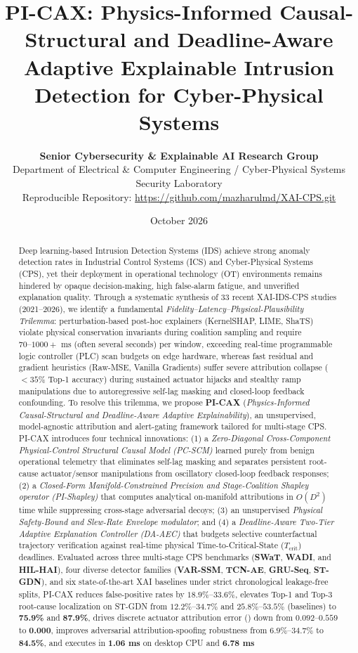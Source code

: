 \documentclass[10pt,a4paper]{article}
\title{\vspace{-12pt}\textbf{\Large\color{primary}PI-CAX: Physics-Informed Causal-Structural and Deadline-Aware Adaptive Explainable Intrusion Detection for Cyber-Physical Systems}}
\author{\textbf{Senior Cybersecurity \& Explainable AI Research Group}\\
\small Department of Electrical \& Computer Engineering / Cyber-Physical Systems Security Laboratory\\
\small Reproducible Repository: \url{https://github.com/mazharulmd/XAI-CPS.git}}
\date{\small October 2026}
\begin{document}
\maketitle
\thispagestyle{fancy}

\begin{abstract}
\noindent Deep learning-based Intrusion Detection Systems (IDS) achieve strong anomaly detection rates in Industrial Control Systems (ICS) and Cyber-Physical Systems (CPS), yet their deployment in operational technology (OT) environments remains hindered by opaque decision-making, high false-alarm fatigue, and unverified explanation quality. Through a systematic synthesis of 33 recent XAI-IDS-CPS studies (2021--2026), we identify a fundamental \emph{Fidelity--Latency--Physical-Plausibility Trilemma}: perturbation-based post-hoc explainers (KernelSHAP, LIME, ShaTS) violate physical conservation invariants during coalition sampling and require $70\text{--}1000+\text{ ms}$ (often several seconds) per window, exceeding real-time programmable logic controller (PLC) scan budgets on edge hardware, whereas fast residual and gradient heuristics (Raw-MSE, Vanilla Gradients) suffer severe attribution collapse ($<35\%$ Top-1 accuracy) during sustained actuator hijacks and stealthy ramp manipulations due to autoregressive self-lag masking and closed-loop feedback confounding. To resolve this trilemma, we propose \textbf{PI-CAX} (\emph{Physics-Informed Causal-Structural and Deadline-Aware Adaptive Explainability}), an unsupervised, model-agnostic attribution and alert-gating framework tailored for multi-stage CPS. PI-CAX introduces four technical innovations: (1) a \emph{Zero-Diagonal Cross-Component Physical-Control Structural Causal Model (PC-SCM)} learned purely from benign operational telemetry that eliminates self-lag masking and separates persistent root-cause actuator/sensor manipulations from oscillatory closed-loop feedback responses; (2) a \emph{Closed-Form Manifold-Constrained Precision and Stage-Coalition Shapley operator (PI-Shapley)} that computes analytical on-manifold attributions in $O(D^2)$ time while suppressing cross-stage adversarial decoys; (3) an unsupervised \emph{Physical Safety-Bound and Slew-Rate Envelope modulator}; and (4) a \emph{Deadline-Aware Two-Tier Adaptive Explanation Controller (DA-AEC)} that budgets selective counterfactual trajectory verification against real-time physical Time-to-Critical-State ($T_{\text{crit}}$) deadlines. Evaluated across three multi-stage CPS benchmarks (\textbf{SWaT}, \textbf{WADI}, and \textbf{HIL-HAI}), four diverse detector families (\textbf{VAR-SSM}, \textbf{TCN-AE}, \textbf{GRU-Seq}, \textbf{ST-GDN}), and six state-of-the-art XAI baselines under strict chronological leakage-free splits, PI-CAX reduces false-positive rates by $18.9\%\text{--}33.6\%$, elevates Top-1 and Top-3 root-cause localization on ST-GDN from $12.2\%\text{--}34.7\%$ and $25.8\%\text{--}53.5\%$ (baselines) to \textbf{75.9\%} and \textbf{87.9\%}, drives discrete actuator attribution error () down from $0.092\text{--}0.559$ to \textbf{0.000}, improves adversarial attribution-spoofing robustness from $6.9\%\text{--}34.7\%$ to \textbf{84.5\%}, and executes in \textbf{1.06 ms} on desktop CPU and \textbf{6.78 ms} 
\end{abstract}
\end{document}
